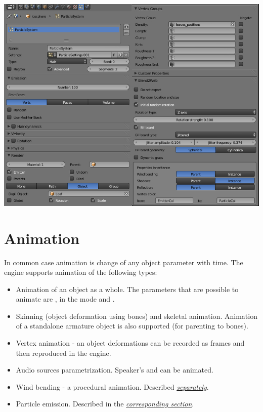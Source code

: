 \documentclass[a4paper,12pt,oneside]{sphinxmanual}
\begin{document}
{\hfill\includegraphics[width=1.000\linewidth]{particle_settings.jpg}\hfill}
\label{animation:animation}

\chapter{Animation}
\label{animation:index-0}\label{animation::doc}\label{animation:id1}
In common case animation is change of any object parameter with time. The engine supports animation of the following types:
\begin{itemize}
\item {} 
Animation of an object as a whole. The parameters that are possible to animate are ,  in the  mode and .

\item {} 
Skinning (object deformation using bones) and skeletal animation. Animation of a standalone armature object is also supported (for parenting to bones).

\item {} 
Vertex animation - an object deformations can be recorded as frames and then reproduced in the engine.

\item {} 
Audio sources parametrization. Speaker's  and  can be animated.

\item {} 
Wind bending - a procedural animation. Described {\hyperref[outdoor_rendering:wind]{\emph{separately}}}.

\item {} 
Particle emission. Described in the {\hyperref[particles:particles]{\emph{corresponding section}}}.

\end{itemize}
\end{document}
